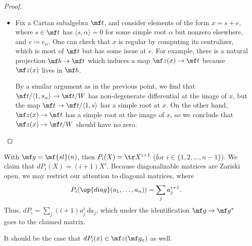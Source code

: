 \documentclass[../notes.tex]{subfiles}
\begin{document}
\begin{proof}
\begin{itemize}
		\item Fix a Cartan subalgebra $\mf t$, and consider elements of the form $x=s+e$, where $s\in\mf t$ has $\langle s,\alpha\rangle=0$ for some simple root $\alpha$ but nonzero elsewhere, and $e\coloneqq e_\alpha$. One can check that $x$ is regular by computing its centralizer, which is most of $\mf t$ but has some issue at $e$. For example, there is a natural projection $\mf b\to\mf t$ which induces a map $\mf z(x)\to\mf t$ because $\mf z(x)$ lives in $\mf b$.

		By a similar argument as in the previous point, we find that $\mf t/\langle1,s_\alpha\rangle\to\mf t/W$ has non-degenerate differential at the image of $x$, but the map $\mf t\to\mf t/\langle1,s\rangle$ has a simple root at $x$. On the other hand, $\mf z(x)\to\mf t$ has a simple root at the image of $x$, so we conclude that $\mf z(x)\to\mf t/W$ should have no zero.
		\qedhere
	\end{itemize}
\end{proof}
\begin{example}
	With $\mf g=\mf{sl}(n)$, then $P_i(X)=\tr X^{i+1}$ (for $i\in\{1,2,\ldots,n-1\}$). We claim that $dP_i(X)=(i+1)X^i$. Because diagonalizable matrices are Zariski open, we may restrict our attention to diagonal matrices, where
	\[P_i(\op{diag}(a_1,\ldots,a_n))=\sum_ja_j^{i+1}.\]
	Thus, $dP_i=\sum_j(i+1)a_j^i\,da_j$, which under the identification $\mf g\to\mf g^*$ goes to the claimed matrix.
\end{example}
\begin{remark}
	It should be the case that $dP_i(x)\in\mf z(\mf g_x)$ as well.
\end{remark}
\end{document}

